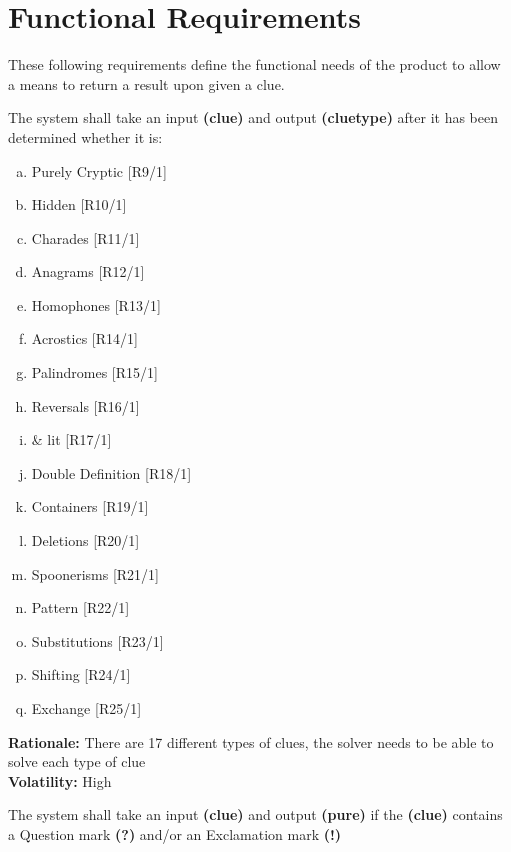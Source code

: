 \section{Functional Requirements}

These following requirements define the functional needs of the product to allow a means to return a result upon given a clue.

\noindent\llap{\textbf{[R8/1]}}The system shall take an input \textbf{\textbf{(clue)}} and output \textbf{(cluetype)} after it has been determined whether it is:

\begin{enumerate} [(a)] %
\item Purely Cryptic 				\hfill{[R9/1]}
\item Hidden 						\hfill{[R10/1]}
\item Charades 						\hfill{[R11/1]}
\item Anagrams 						\hfill{[R12/1]}
\item Homophones 					\hfill{[R13/1]}
\item Acrostics 					\hfill{[R14/1]}
\item Palindromes 					\hfill{[R15/1]}
\item Reversals 					\hfill{[R16/1]}
\item \& lit 						\hfill{[R17/1]}
\item Double Definition 			\hfill{[R18/1]}
\item Containers 					\hfill{[R19/1]}
\item Deletions 					\hfill{[R20/1]}
\item Spoonerisms 					\hfill{[R21/1]}
\item Pattern 						\hfill{[R22/1]}
\item Substitutions 				\hfill{[R23/1]}
\item Shifting 						\hfill{[R24/1]}
\item Exchange 						\hfill{[R25/1]}
\end{enumerate}

\textbf{Rationale:}  There are 17 different types of clues, the solver needs to be able to solve each type of clue\\
\textbf{Volatility:} High

\noindent\llap{\textbf{[R9/1]}}The system shall take an input \textbf{(clue)} and output \textbf{(pure)} if the \textbf{(clue)} contains a Question mark \textbf{(?)} and/or an Exclamation mark \textbf{(!)}\\

